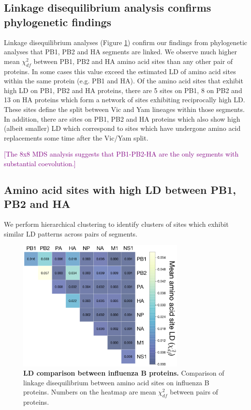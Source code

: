\documentclass[11pt,oneside,letterpaper]{article}
\def\tbc#1{\textcolor{purple}{[#1]}}
\begin{document}
\subsection*{Linkage disequilibrium analysis confirms phylogenetic findings}
Linkage disequilibrium analyses (Figure \ref{segmentLD}) confirm our findings from phylogenetic analyses that PB1, PB2 and HA segments are linked.
We observe much higher mean $\chi^{2}_{df}$ between PB1, PB2 and HA amino acid sites than any other pair of proteins.
In some cases this value exceed the estimated LD of amino acid sites within the same protein (e.g. PB1 and HA).
Of the amino acid sites that exhibit high LD on PB1, PB2 and HA proteins, there are 5 sites on PB1, 8 on PB2 and 13 on HA proteins which form a network of sites exhibiting reciprocally high LD.
These sites define the split between Vic and Yam lineages within those segments.
In addition, there are sites on PB1, PB2 and HA proteins which also show high (albeit smaller) LD which correspond to sites which have undergone amino acid replacements some time after the Vic/Yam split.


\tbc{The 8x8 MDS analysis suggests that PB1-PB2-HA are the only segments with substantial coevolution.}

\subsection*{Amino acid sites with high LD between PB1, PB2 and HA}


We perform hierarchical clustering to identify clusters of sites which exhibit similar LD patterns across pairs of segments.


\begin{figure}[h]
	\centering	
	\includegraphics[width=0.75\textwidth]	{figures/InfB_segmentLD.png}
	\caption{\textbf{LD comparison between influenza B proteins.}
Comparison of linkage disequilibrium between amino acid sites on influenza B proteins.
Numbers on the heatmap are mean $\chi^{2}_{df}$ between pairs of proteins.}
	\label{segmentLD}
\end{figure}
\end{document}
